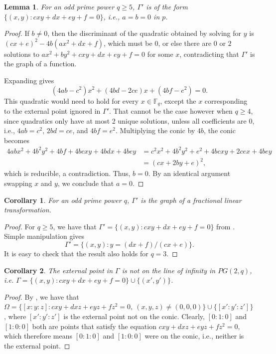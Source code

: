 \documentclass[12pt]{article}
\newcommand{\F}{\mathbb{F}}
\newtheorem{corollary}{Corollary}[theorem]
\newtheorem{lemma}[theorem]{Lemma}
\begin{document}
\begin{lemma}\label{lem:ab0}
    For an odd prime power $q \geq 5$, $\Gamma'$ is of the form $\{(x,y): cxy + dx +ey + f = 0\}$, i.e., $a=b=0$ in $p$.
\end{lemma}

\begin{proof}

If $b\neq 0$, then the discriminant of the quadratic obtained by solving for $y$ is $(cx+e)^2-4b(ax^2+dx+f)$, which must be $0$, or else there are $0$ or $2$ solutions to $ax^2+by^2+cxy+dx+ey+f=0$ for some $x$, contradicting that $\Gamma'$ is the graph of a function.

Expanding gives
\[
(4ab-c^2)x^2+(4bd-2ce)x+(4bf-e^2)=0.
\]
This quadratic would need to hold for every $x\in\F_q$, except the $x$ corresponding to the external point ignored in $\Gamma'$. That cannot be the case however when $q\geq4$, since quadratics only have at most 2 unique solutions, unless all coefficients are $0$, i.e., $4ab=c^2$, $2bd=ce$, and $4bf=e^2$.   Multiplying the conic by $4b$, the conic becomes
\begin{align*}
4abx^2+4b^2y^2+4bf+4bcxy+4bdx+4bey &= c^2 x^2+4b^2 y^2+e^2+4bcxy+2cex+4bey \\
&= (cx + 2by + e)^2,
\end{align*}
which is reducible, a contradiction.  Thus, $b=0$.  By an identical argument swapping $x$ and $y$, we conclude that $a=0$. 

\end{proof}

\begin{corollary}\label{cor:frac}
For an odd prime power $q$, $\Gamma'$ is the graph of a fractional linear transformation.
\end{corollary}

\begin{proof}
For $q \geq 5$, we have that $\Gamma' = \{(x,y): cxy + dx +ey + f = 0\}$ from . Simple manipulation gives
\[
\Gamma' = \{(x,y) : y = (dx+f)/(cx+e)\}.
\]
It is easy to check that the result also holds for $q=3$.
\end{proof}

\begin{corollary}\label{cor:hasext}
The external point in $\Gamma$ is not on the line of infinity in $PG(2,q)$, i.e. $\Gamma = \{(x,y): cxy + dx +ey + f = 0\} \cup \{(x',y')\}$.
\end{corollary}

\begin{proof}
By , we have that $\Omega = \{[x:y:z] : cxy + dxz +eyz + fz^2 = 0,\ (x,y,z)\neq(0,0,0)\} \cup \{ [x':y':z'] \}$, where $[x':y':z']$ is the external point not on the conic. Clearly, $[0:1:0]$ and $[1:0:0]$ both are points that satisfy the equation $cxy + dxz +eyz + fz^2 = 0$, which therefore means $[0:1:0]$ and $[1:0:0]$ were on the conic, i.e., neither is the external point.
\end{proof}
\end{document}
